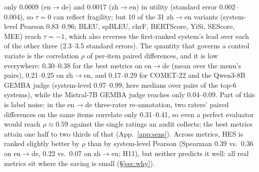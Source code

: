 \documentclass[11pt]{article}
\begin{document}
only 0.0009 (en$\to$de) and 0.0017 (zh$\to$en) in utility (standard error 0.002--0.004), so $\tau=0$ can reflect fragility;
but 10 of the 31 zh$\to$en variants (system-level Pearson 0.83--0.96; BLEU, spBLEU, chrF, BERTScore, YiSi, SEScore, MEE)
reach $\tau=-1$, which also reverses the first-ranked system's lead over each of the other three (2.3--3.5 standard errors). The
quantity that governs a control variate is the correlation $\rho$ of per-item paired differences, and it is low
everywhere: 0.30--0.38 for the best metrics on en$\to$de (mean over the menu's pairs), 0.21--0.25 on zh$\to$en, and 0.17--0.29 for COMET-22 and the
Qwen3-8B GEMBA judge (system-level 0.97--0.99; here medians over pairs of the top-6 systems), while the Mistral-7B GEMBA
judge reaches only 0.04--0.09. Part of this is label noise: in the en$\to$de three-rater re-annotation, two raters'
paired differences on the same items correlate only 0.31--0.41, so even a perfect evaluator would reach $\rho\approx0.59$
against the single ratings an audit collects; the best metrics attain one half to two thirds of that (App.~\ref{app:sens}). Across metrics, HES is ranked slightly better by $\rho$ than by system-level Pearson (Spearman 0.39 vs.\
0.36 on en$\to$de, 0.22 vs.\ 0.07 on zh$\to$en; H11), but neither predicts it well: all real metrics sit where the
saving is small (\S\ref{sec:why}).
\end{document}
